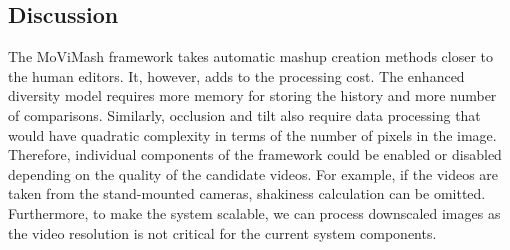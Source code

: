 \documentclass{sig-alternate-05-2015}
\begin{document}
\subsection{Discussion}
The MoViMash framework takes automatic mashup creation methods closer to the human editors. It, however, adds to the processing
cost. The enhanced diversity model requires more memory for storing the history and more number of comparisons. Similarly, occlusion and tilt also require data processing that would have quadratic
complexity in terms of the number of pixels in the image. Therefore, individual components of the framework could be enabled or
disabled depending on the quality of the candidate videos. For example, if the videos are taken from the stand-mounted cameras,
shakiness calculation can be omitted. Furthermore, to make the
system scalable, we can process downscaled images as the video
resolution is not critical for the current system components.
\end{document}
